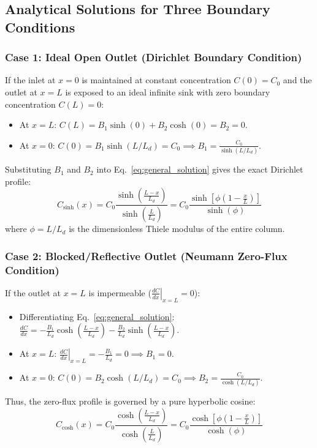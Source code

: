 \documentclass[11pt,a4paper]{article}
\begin{document}
\subsection{Analytical Solutions for Three Boundary Conditions}

\subsubsection{Case 1: Ideal Open Outlet (Dirichlet Boundary Condition)}
If the inlet at $x=0$ is maintained at constant concentration $C(0) = C_0$ and the outlet at $x=L$ is exposed to an ideal infinite sink with zero boundary concentration $C(L) = 0$:
\begin{itemize}
    \item At $x = L$: $C(L) = B_1 \sinh(0) + B_2 \cosh(0) = B_2 = 0$.
    \item At $x = 0$: $C(0) = B_1 \sinh(L/L_d) = C_0 \implies B_1 = \frac{C_0}{\sinh(L/L_d)}$.
\end{itemize}
Substituting $B_1$ and $B_2$ into Eq.~\eqref{eq:general_solution} gives the exact Dirichlet profile:
\begin{equation}
    C_{\text{sinh}}(x) = C_0 \frac{\sinh\left(\frac{L - x}{L_d}\right)}{\sinh\left(\frac{L}{L_d}\right)} = C_0 \frac{\sinh\left[\phi\left(1 - \frac{x}{L}\right)\right]}{\sinh(\phi)}
    \label{eq:sol_sinh}
\end{equation}
where $\phi = L / L_d$ is the dimensionless Thiele modulus of the entire column.

\subsubsection{Case 2: Blocked/Reflective Outlet (Neumann Zero-Flux Condition)}
If the outlet at $x=L$ is impermeable ($\left.\frac{dC}{dx}\right|_{x=L} = 0$):
\begin{itemize}
    \item Differentiating Eq.~\eqref{eq:general_solution}: $\frac{dC}{dx} = -\frac{B_1}{L_d}\cosh\left(\frac{L-x}{L_d}\right) - \frac{B_2}{L_d}\sinh\left(\frac{L-x}{L_d}\right)$.
    \item At $x = L$: $\left.\frac{dC}{dx}\right|_{x=L} = -\frac{B_1}{L_d} = 0 \implies B_1 = 0$.
    \item At $x = 0$: $C(0) = B_2 \cosh(L/L_d) = C_0 \implies B_2 = \frac{C_0}{\cosh(L/L_d)}$.
\end{itemize}
Thus, the zero-flux profile is governed by a pure hyperbolic cosine:
\begin{equation}
    C_{\text{cosh}}(x) = C_0 \frac{\cosh\left(\frac{L - x}{L_d}\right)}{\cosh\left(\frac{L}{L_d}\right)} = C_0 \frac{\cosh\left[\phi\left(1 - \frac{x}{L}\right)\right]}{\cosh(\phi)}
    \label{eq:sol_cosh}
\end{equation}
\end{document}

